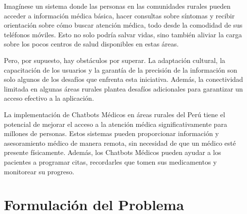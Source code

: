 Imagínese un sistema donde las personas en las comunidades rurales pueden acceder a información médica básica, hacer consultas sobre síntomas y recibir orientación sobre cómo buscar atención médica, todo desde la comodidad de sus teléfonos móviles. Esto no solo podría salvar vidas, sino también aliviar la carga sobre los pocos centros de salud disponibles en estas áreas.

Pero, por supuesto, hay obstáculos por superar. La adaptación cultural, la capacitación de los usuarios y la garantía de la precisión de la información son solo algunos de los desafíos que enfrenta esta iniciativa. Además, la conectividad limitada en algunas áreas rurales plantea desafíos adicionales para garantizar un acceso efectivo a la aplicación.

La implementación de Chatbots Médicos en áreas rurales del Perú tiene el potencial de mejorar el acceso a la atención médica significativamente para millones de personas. Estos sistemas pueden proporcionar información y asesoramiento médico de manera remota, sin necesidad de que un médico esté presente físicamente. Además, los Chatbots Médicos pueden ayudar a los pacientes a programar citas, recordarles que tomen sus medicamentos y monitorear su progreso. 



\section{Formulación del Problema}



